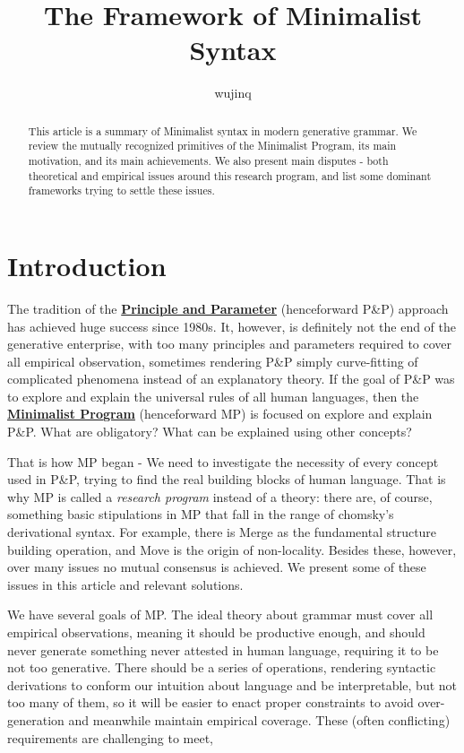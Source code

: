 \documentclass[a4paper]{article}
\title{The Framework of Minimalist Syntax}
\author{wujinq}
\newcommand*{\concept}[1]{\underline{\textbf{#1}}}
\begin{document}
\maketitle

\begin{abstract}
    This article is a summary of Minimalist syntax in modern generative grammar.
    We review the mutually recognized primitives of the Minimalist Program, its main motivation, and its main achievements.
    We also present main disputes - both theoretical and empirical issues around this research program, and list some dominant frameworks trying to settle these issues.  
\end{abstract}


\section{Introduction}

The tradition of the \concept{Principle and Parameter} (henceforward P\&P) approach has achieved huge success since 1980s. 
It, however, is definitely not the end of the generative enterprise, with too many principles and parameters required to cover all empirical observation, sometimes rendering P\&P simply curve-fitting of complicated phenomena instead of an explanatory theory.
If the goal of P\&P was to explore and explain the universal rules of all human languages, then the \concept{Minimalist Program} (henceforward MP) is focused on explore and explain P\&P.
What are obligatory? What can be explained using other concepts? 

That is how MP began - We need to investigate the necessity of every concept used in P\&P, trying to find the real building blocks of human language.
That is why MP is called a \emph{research program} instead of a theory: there are, of course, something basic stipulations in MP that fall in the range of chomsky's derivational syntax.
For example, there is Merge as the fundamental structure building operation, and Move is the origin of non-locality.
Besides these, however, over many issues no mutual consensus is achieved. We present some of these issues in this article and relevant solutions.

We have several goals of MP. The ideal theory about grammar must cover all empirical observations, meaning it should be productive enough, and should never generate something never attested in human language, requiring it to be not too generative.
There should be a series of operations, rendering syntactic derivations to conform our intuition about language and be interpretable, but not too many of them, so it will be easier to enact proper constraints to avoid over-generation and meanwhile maintain empirical coverage.
These (often conflicting) requirements are challenging to meet, 
\end{document}
